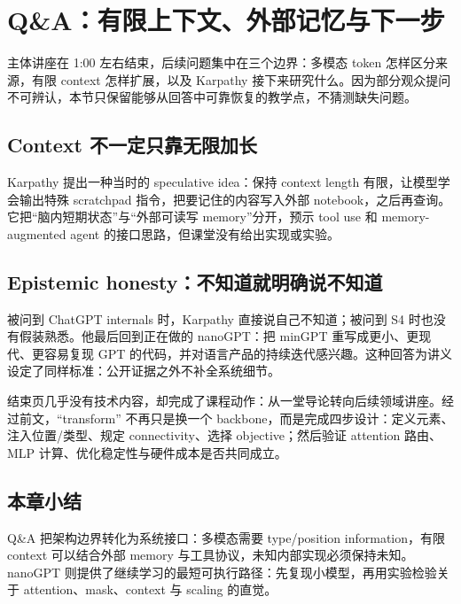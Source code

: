 \section{Q\&A：有限上下文、外部记忆与下一步}

主体讲座在 1:00 左右结束，后续问题集中在三个边界：多模态 token 怎样区分来源，有限 context 怎样扩展，以及 Karpathy 接下来研究什么。因为部分观众提问不可辨认，本节只保留能够从回答中可靠恢复的教学点，不猜测缺失问题。

\subsection{Context 不一定只靠无限加长}

Karpathy 提出一种当时的 speculative idea：保持 context length 有限，让模型学会输出特殊 scratchpad 指令，把要记住的内容写入外部 notebook，之后再查询。它把“脑内短期状态”与“外部可读写 memory”分开，预示 tool use 和 memory-augmented agent 的接口思路，但课堂没有给出实现或实验。


\subsection{Epistemic honesty：不知道就明确说不知道}

被问到 ChatGPT internals 时，Karpathy 直接说自己不知道；被问到 S4 时也没有假装熟悉。他最后回到正在做的 nanoGPT：把 minGPT 重写成更小、更现代、更容易复现 GPT 的代码，并对语言产品的持续迭代感兴趣。这种回答为讲义设定了同样标准：公开证据之外不补全系统细节。


结束页几乎没有技术内容，却完成了课程动作：从一堂导论转向后续领域讲座。经过前文，``transform'' 不再只是换一个 backbone，而是完成四步设计：定义元素、注入位置/类型、规定 connectivity、选择 objective；然后验证 attention 路由、MLP 计算、优化稳定性与硬件成本是否共同成立。

\subsection{本章小结}

Q\&A 把架构边界转化为系统接口：多模态需要 type/position information，有限 context 可以结合外部 memory 与工具协议，未知内部实现必须保持未知。nanoGPT 则提供了继续学习的最短可执行路径：先复现小模型，再用实验检验关于 attention、mask、context 与 scaling 的直觉。

